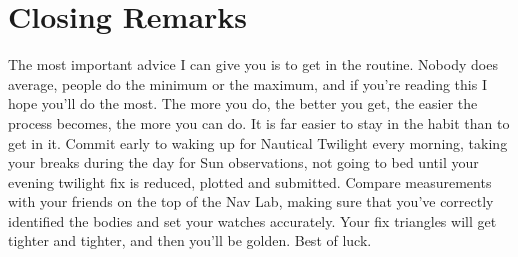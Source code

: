 \documentclass[letterpaper,12pt]{article}
\begin{document}
\section{Closing Remarks}
The most important advice I can give you is to get in the routine.
Nobody does average, people do the minimum or the maximum, and if you're reading this I hope you'll do the most.
The more you do, the better you get, the easier the process becomes, the more you can do.
It is far easier to stay in the habit than to get in it.
Commit early to waking up for Nautical Twilight every morning, taking your breaks during the day for Sun observations, not going to bed until your evening twilight fix is reduced, plotted and submitted.
Compare measurements with your friends on the top of the Nav Lab, making sure that you've correctly identified the bodies and set your watches accurately.
Your fix triangles will get tighter and tighter, and then you'll be golden.
Best of luck.
\clearpage
\printbibliography
\end{document}

